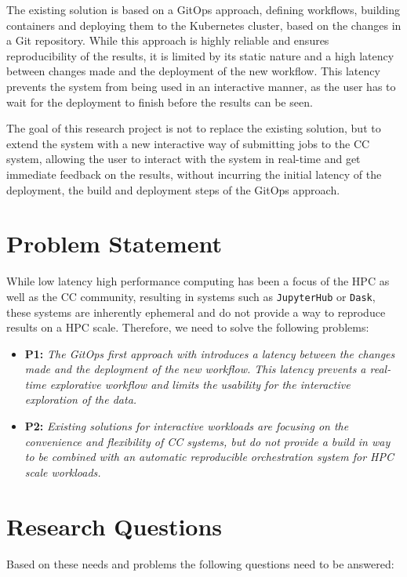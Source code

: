 The existing solution is based on a \gls{GitOps} approach, defining workflows, building containers and deploying them to the Kubernetes cluster,
based on the changes in a Git repository. While this approach is highly reliable and ensures reproducibility of the results,
it is limited by its static nature and a high latency between changes made and the deployment of the new workflow.
This latency prevents the system from being used in an interactive manner, as the user has to wait for the deployment to finish before the results can be seen.

The goal of this research project is not to replace the existing solution, but to extend the system with a new interactive way of
submitting jobs to the \ac{CC} system, allowing the user to interact with the system in real-time and get immediate feedback on the results,
without incurring the initial latency of the deployment, the build and deployment steps of the \gls{GitOps} approach.

\section{Problem Statement}
\label{ProblemStatement}

While low latency high performance computing has been a focus of the \ac{HPC} as well as the \ac{CC} community,
resulting in systems such as \texttt{JupyterHub} or \texttt{Dask}, these systems are inherently ephemeral and do not provide a way to reproduce results on a \ac{HPC} scale.
Therefore, we need to solve the following problems:

\begin{itemize}
    \item \textbf{P1:} \textit{The \gls{GitOps} first approach with introduces a latency between the changes made and the deployment of the new workflow.
              This latency prevents a real-time explorative workflow and limits the usability for the interactive exploration of the data.
          }
    \item \textbf{P2:} \textit{Existing solutions for interactive workloads are focusing on the convenience and flexibility of \ac{CC} systems,
              but do not provide a build in way to be combined with an automatic reproducible orchestration system for \ac{HPC} scale workloads.
          }
\end{itemize}

\section{Research Questions}
Based on these needs and problems the following questions need to be answered:


